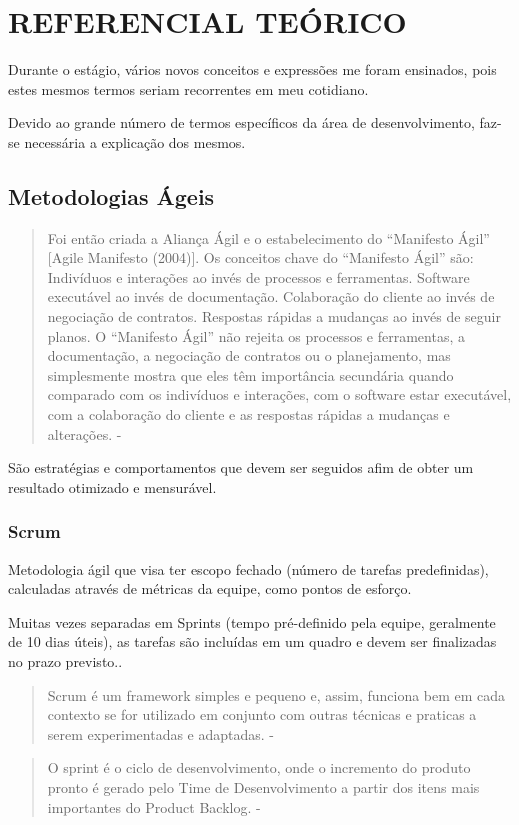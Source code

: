 \chapter{REFERENCIAL TEÓRICO}
\label{cap:elementos}

Durante o estágio, vários novos conceitos e expressões me foram ensinados, pois estes mesmos termos seriam recorrentes em meu cotidiano.

Devido ao grande número de termos específicos da área de desenvolvimento, faz-se necessária a explicação dos mesmos.

\section{Metodologias Ágeis}

\begin{quote}
  Foi então criada a Aliança Ágil e o estabelecimento do “Manifesto Ágil” [Agile Manifesto (2004)].
Os conceitos chave do “Manifesto Ágil” são:
Indivíduos e interações ao invés de processos e ferramentas.
Software executável ao invés de documentação.
Colaboração do cliente ao invés de negociação de contratos.
Respostas rápidas a mudanças ao invés de seguir planos.
O “Manifesto Ágil” não rejeita os processos e ferramentas, a documentação, a negociação de contratos ou
o planejamento, mas simplesmente mostra que eles têm
importância secundária quando comparado com os indivíduos e interações, com o software estar executável,
com a colaboração do cliente e as respostas rápidas a
mudanças e alterações. - \cite{INFOCOMP}

\end{quote}
São estratégias e comportamentos que devem ser seguidos afim de obter um resultado otimizado e mensurável.

\subsection{Scrum}

Metodologia ágil que visa ter escopo fechado (número de tarefas predefinidas), calculadas através de métricas da equipe, como pontos de esforço.

Muitas vezes separadas em Sprints (tempo pré-definido pela equipe, geralmente de 10 dias úteis), as tarefas são incluídas em um quadro e devem ser finalizadas no prazo previsto..
\begin{quote}
  Scrum é um framework simples e pequeno e, assim, funciona bem em  cada contexto se for utilizado em conjunto com outras técnicas e praticas a serem experimentadas e adaptadas. - \cite{sabbagh2014scrum}
\end{quote}
\begin{quote}
  O sprint é o ciclo de desenvolvimento, onde o incremento do produto pronto é gerado pelo Time de Desenvolvimento a partir dos itens mais importantes do Product Backlog. - \cite{sabbagh2014scrum}
\end{quote}

